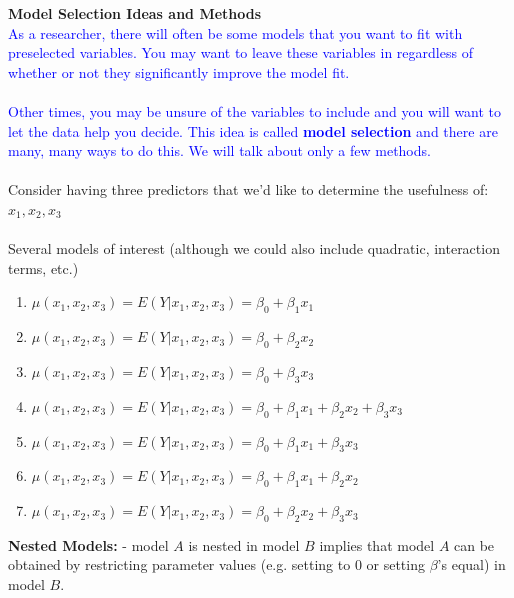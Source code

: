 \begin{flushright}
\end{flushright}

\newpage

\Large\textbf{Model Selection Ideas and Methods}\large\\

\textcolor{blue}{As a researcher, there will often be some models that you want to fit with preselected variables.  You may want to leave these variables in regardless of whether or not they significantly improve the model fit.\\~\\
Other times, you may be unsure of the variables to include and you will want to let the data help you decide.  This idea is called \textbf{model selection} and there are many, many ways to do this.  We will talk about only a few methods.}\\~\\


Consider having three predictors that we'd like to determine the usefulness of: $x_1,x_2,x_3$\\~\\
Several models of interest (although we could also include quadratic, interaction terms, etc.)
\begin{enumerate}
\item $\mu(x_1,x_2,x_3) = E(Y|x_1,x_2,x_3) =  \beta_0 + \beta_1 x_1$
\item $\mu(x_1,x_2,x_3) = E(Y|x_1,x_2,x_3) =  \beta_0 + \beta_2 x_2$
\item $\mu(x_1,x_2,x_3) = E(Y|x_1,x_2,x_3) =  \beta_0 + \beta_3 x_3$
\item $\mu(x_1,x_2,x_3) = E(Y|x_1,x_2,x_3) =  \beta_0 + \beta_1 x_1 + \beta_2 x_2 + \beta_3 x_3$
\item $\mu(x_1,x_2,x_3) = E(Y|x_1,x_2,x_3) =  \beta_0 + \beta_1 x_1 + \beta_3 x_3$
\item $\mu(x_1,x_2,x_3) = E(Y|x_1,x_2,x_3) =  \beta_0 + \beta_1 x_1 + \beta_2 x_2$
\item $\mu(x_1,x_2,x_3) = E(Y|x_1,x_2,x_3) =  \beta_0 + \beta_2 x_2 + \beta_3 x_3$
\end{enumerate}

\textbf{Nested Models:} - model $A$ is nested in model $B$ implies that model $A$ can be obtained by restricting parameter values (e.g. setting to 0 or setting $\beta$'s equal) in model $B$.\\~\\

